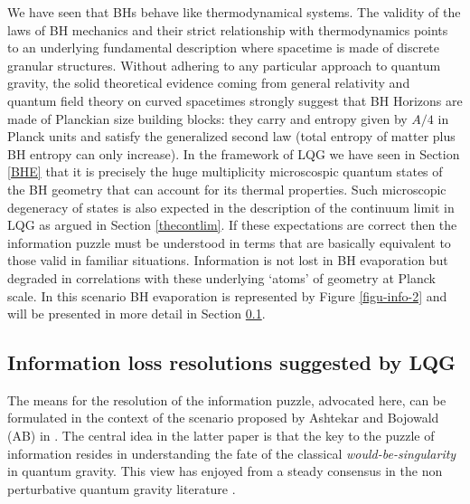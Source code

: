\documentclass[aps, nofootinbib,superscriptaddress,12pt]{revtex4-2}
\begin{document}
\begin{enumerate}
We have seen that BHs behave like thermodynamical systems. The validity of the laws of BH mechanics and their strict relationship with thermodynamics points to an underlying fundamental description where spacetime is made of discrete granular structures. Without adhering to any particular approach to quantum gravity, the solid theoretical evidence coming from general relativity and quantum field theory on curved spacetimes strongly suggest that BH Horizons are made of Planckian size building blocks: they carry and entropy given by $A/4$ in Planck units and satisfy the generalized second law (total entropy of matter plus BH entropy can only increase). In the framework of LQG we have seen in Section \ref{BHE} that it is precisely the huge multiplicity microscospic quantum states of the BH geometry that can account for its   thermal properties. Such microscopic degeneracy of states is also expected in the description of the continuum limit in LQG as argued in Section \ref{thecontlim}.  If these expectations are correct then the information puzzle must be understood in terms that are basically equivalent to those valid in familiar situations. Information is not lost in BH evaporation but degraded in correlations with these underlying `atoms' of geometry at Planck scale. In this scenario BH evaporation is represented by Figure \ref{figu-info-2} and will be presented in more detail in Section \ref{info-lqg}.




\end{enumerate}



\subsection{Information loss resolutions suggested by LQG}\label{info-lqg}

The means for the resolution of the information puzzle, advocated here, can be formulated in the context of the scenario proposed by Ashtekar and Bojowald (AB) in \cite{Ashtekar:2005cj}. 
The central idea in the latter paper is that the key to the puzzle of information resides in understanding the fate of the classical {\em would-be-singularity} in quantum gravity. This view has enjoyed from a steady consensus in the non perturbative quantum gravity literature \cite{Hossenfelder:2009xq}.
\end{document}

